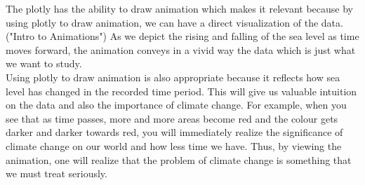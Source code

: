 \documentclass[fontsize=11pt]{article}
\begin{document}
    The plotly has the ability to draw animation which makes it relevant because by using plotly to draw animation, we can have a direct visualization of the data. ("Intro to Animations") As we depict the rising and falling of the sea level as time moves forward, the animation conveys in a vivid way the data which is just what we want to study. \\
    Using plotly to draw animation is also appropriate because it reflects how sea level has changed in the recorded time period. This will give us valuable intuition on the data and also the importance of climate change. For example, when you see that as time passes, more and more areas become red and the colour gets darker and darker towards red, you will immediately realize the significance of climate change on our world and how less time we have. Thus, by viewing the animation, one will realize that the problem of climate change is something that we must treat seriously.
\end{document}

